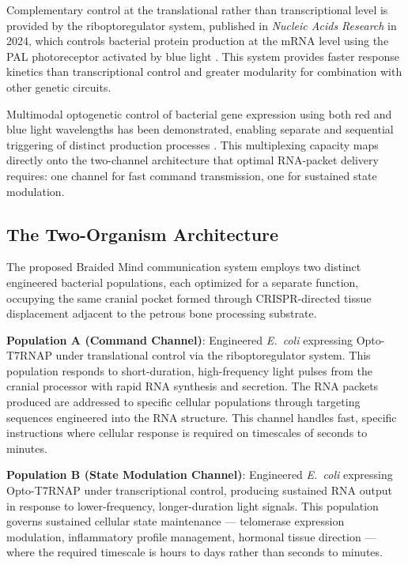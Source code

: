 \documentclass[12pt]{article}
\begin{document}
Complementary control at the translational rather than transcriptional level is provided by the riboptoregulator system, published in \textit{Nucleic Acids Research} in 2024, which controls bacterial protein production at the mRNA level using the PAL photoreceptor activated by blue light \cite{riboptoregulator_2024}. This system provides faster response kinetics than transcriptional control and greater modularity for combination with other genetic circuits.

Multimodal optogenetic control of bacterial gene expression using both red and blue light wavelengths has been demonstrated, enabling separate and sequential triggering of distinct production processes \cite{red_light_bacterial_2022}. This multiplexing capacity maps directly onto the two-channel architecture that optimal RNA-packet delivery requires: one channel for fast command transmission, one for sustained state modulation.

\subsection{The Two-Organism Architecture}

The proposed Braided Mind communication system employs two distinct engineered bacterial populations, each optimized for a separate function, occupying the same cranial pocket formed through CRISPR-directed tissue displacement adjacent to the petrous bone processing substrate.

\textbf{Population A (Command Channel)}: Engineered \textit{E.~coli} expressing Opto-T7RNAP under translational control via the riboptoregulator system. This population responds to short-duration, high-frequency light pulses from the cranial processor with rapid RNA synthesis and secretion. The RNA packets produced are addressed to specific cellular populations through targeting sequences engineered into the RNA structure. This channel handles fast, specific instructions where cellular response is required on timescales of seconds to minutes.

\textbf{Population B (State Modulation Channel)}: Engineered \textit{E.~coli} expressing Opto-T7RNAP under transcriptional control, producing sustained RNA output in response to lower-frequency, longer-duration light signals. This population governs sustained cellular state maintenance --- telomerase expression modulation, inflammatory profile management, hormonal tissue direction --- where the required timescale is hours to days rather than seconds to minutes.
\end{document}
